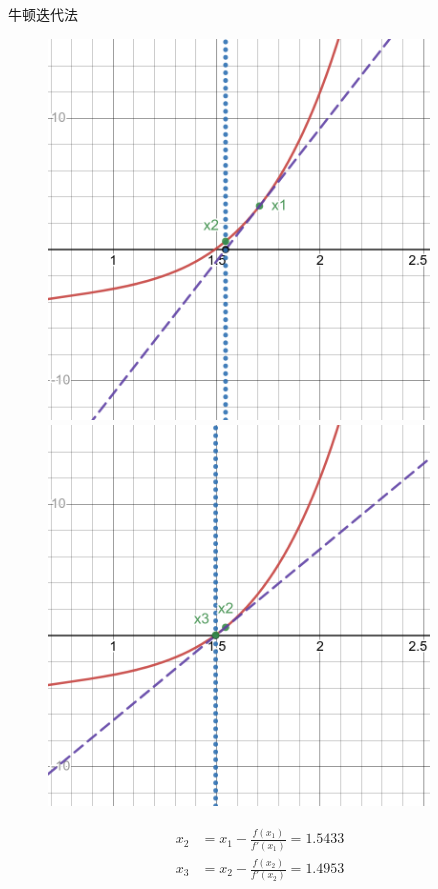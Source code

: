 \documentclass{beamer}
\begin{document}
\begin{frame}{牛顿迭代法}
    \begin{figure}[H]
        \centering
        \begin{minipage}[t]{0.48\textwidth}
            \centering
            \includegraphics[width=0.9\textwidth]{pic/newton3.png}
        \end{minipage}
        \begin{minipage}[t]{0.48\textwidth}
            \centering
            \includegraphics[width=0.9\textwidth]{pic/newton4.png}
        \end{minipage}
    \end{figure}
    \begin{align*}
        x_2 &= x_1 - \frac{f(x_1)}{f'(x_1)} = 1.5433\\
        x_3 &= x_2 - \frac{f(x_2)}{f'(x_2)} = 1.4953
    \end{align*}
\end{frame}
\end{document}
